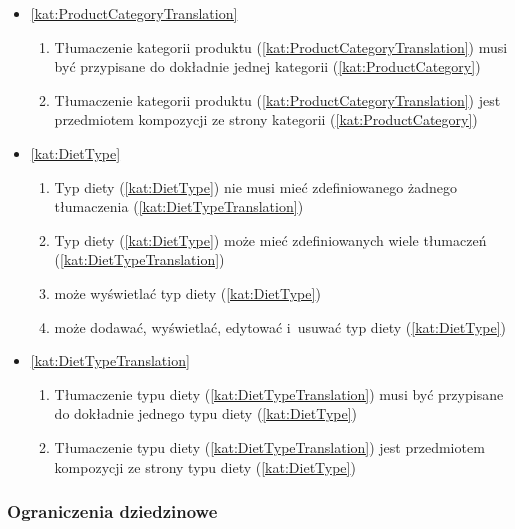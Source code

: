 \begin{itemize}[label={\textbf{Reguły dla}}, wide, labelwidth=!, labelindent=0pt]
\begin{enumerate}[label={\textbf{REG/1/\protect\twodigits{\arabic{enumi}}}}, wide, labelwidth=!, align=left, leftmargin=3cm, resume]
    \end{enumerate}
    \item\ref{kat:ProductCategoryTranslation}\mynobreakpar
    \begin{enumerate}[label={\textbf{REG/1/\protect\twodigits{\arabic{enumi}}}}, wide, labelwidth=!, align=left, leftmargin=3cm, resume]
        \item Tłumaczenie kategorii produktu (\ref{kat:ProductCategoryTranslation}) musi być przypisane do dokładnie jednej kategorii (\ref{kat:ProductCategory})
        \item Tłumaczenie kategorii produktu (\ref{kat:ProductCategoryTranslation}) jest przedmiotem kompozycji ze strony kategorii (\ref{kat:ProductCategory})
    \end{enumerate}
    \item\ref{kat:DietType}\mynobreakpar
    \begin{enumerate}[label={\textbf{REG/1/\protect\twodigits{\arabic{enumi}}}}, wide, labelwidth=!, align=left, leftmargin=3cm, resume]
        \item Typ diety (\ref{kat:DietType}) nie musi mieć zdefiniowanego żadnego tłumaczenia (\ref{kat:DietTypeTranslation})
        \item Typ diety (\ref{kat:DietType}) może mieć zdefiniowanych wiele tłumaczeń (\ref{kat:DietTypeTranslation})
        \item {} może wyświetlać typ diety (\ref{kat:DietType})
        \item {} może dodawać, wyświetlać, edytować i~usuwać typ diety (\ref{kat:DietType})
    \end{enumerate}
    \item\ref{kat:DietTypeTranslation}\mynobreakpar
    \begin{enumerate}[label={\textbf{REG/1/\protect\twodigits{\arabic{enumi}}}}, wide, labelwidth=!, align=left, leftmargin=3cm, resume]
        \item Tłumaczenie typu diety (\ref{kat:DietTypeTranslation}) musi być przypisane do dokładnie jednego typu diety (\ref{kat:DietType})
        \item Tłumaczenie typu diety (\ref{kat:DietTypeTranslation}) jest przedmiotem kompozycji ze strony typu diety (\ref{kat:DietType})
    \end{enumerate}
\end{itemize}

\subsubsection{Ograniczenia dziedzinowe}\label{subsubsec:database:products:restrictions}

